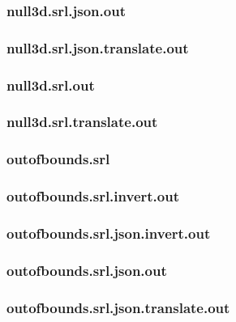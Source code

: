 \subsubsection{null3d.srl.json.out}
\label{app:null3d_srl.json.out}

\subsubsection{null3d.srl.json.translate.out}
\label{app:null3d_srl.json.translate.out}

\subsubsection{null3d.srl.out}
\label{app:null3d_srl.out}

\subsubsection{null3d.srl.translate.out}
\label{app:null3d_srl.translate.out}

\subsubsection{outofbounds.srl}
\label{app:outofbounds_srl}

\subsubsection{outofbounds.srl.invert.out}
\label{app:outofbounds_srl.invert.out}

\subsubsection{outofbounds.srl.json.invert.out}
\label{app:outofbounds_srl.json.invert.out}

\subsubsection{outofbounds.srl.json.out}
\label{app:outofbounds_srl.json.out}

\subsubsection{outofbounds.srl.json.translate.out}
\label{app:outofbounds_srl.json.translate.out}

